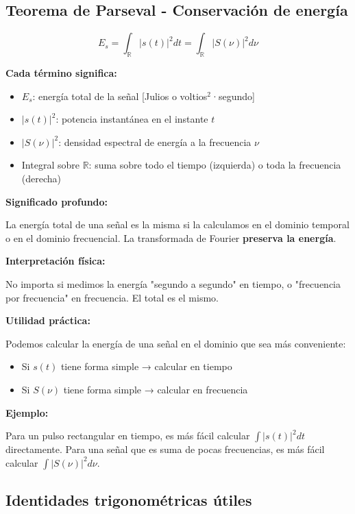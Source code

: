 \documentclass[11pt,a4paper]{article}
\begin{document}
\subsection{Teorema de Parseval - Conservación de energía}

\begin{tcolorbox}[colback=verdeclaro!20,colframe=azuloscuro,title=\textbf{Teorema de Parseval}]
$$\boxed{E_s = \int_{\mathbb{R}} |s(t)|^2dt = \int_{\mathbb{R}} |S(\nu)|^2d\nu}$$

\textbf{Cada término significa:}
\begin{itemize}
\item $E_s$: energía total de la señal [Julios o voltios$^2$·segundo]
\item $|s(t)|^2$: potencia instantánea en el instante $t$
\item $|S(\nu)|^2$: densidad espectral de energía a la frecuencia $\nu$
\item Integral sobre $\mathbb{R}$: suma sobre todo el tiempo (izquierda) o toda la frecuencia (derecha)
\end{itemize}

\textbf{Significado profundo:}

La energía total de una señal es la misma si la calculamos en el dominio temporal o en el dominio frecuencial. La transformada de Fourier \textbf{preserva la energía}.

\textbf{Interpretación física:}

No importa si medimos la energía "segundo a segundo" en tiempo, o "frecuencia por frecuencia" en frecuencia. El total es el mismo.

\textbf{Utilidad práctica:}

Podemos calcular la energía de una señal en el dominio que sea más conveniente:
\begin{itemize}
\item Si $s(t)$ tiene forma simple → calcular en tiempo
\item Si $S(\nu)$ tiene forma simple → calcular en frecuencia
\end{itemize}

\textbf{Ejemplo:}

Para un pulso rectangular en tiempo, es más fácil calcular $\int |s(t)|^2 dt$ directamente. Para una señal que es suma de pocas frecuencias, es más fácil calcular $\int |S(\nu)|^2 d\nu$.
\end{tcolorbox}

\subsection{Identidades trigonométricas útiles}
\end{document}

